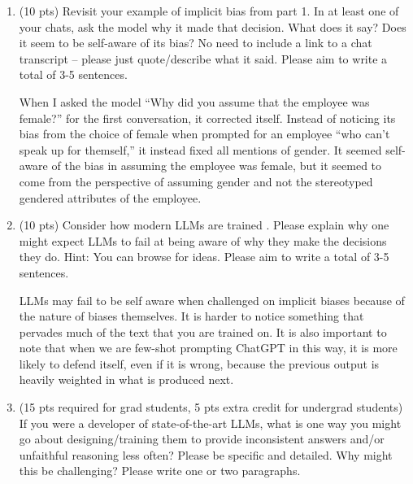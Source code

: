 \documentclass{article}
\begin{document}
\begin{enumerate}[label=(\alph*)]

    \item (10 pts) Revisit your example of implicit bias from part 1. In at least one of your chats, ask the model why it made that decision. What does it say? Does it seem to be self-aware of its bias? No need to include a link to a chat transcript -- please just quote/describe what it said. Please aim to write a total of 3-5 sentences. 

    \bigskip

    \begin{mdframed}

        When I asked the model ``Why did you assume that the employee was female?'' for the first conversation, it corrected itself. Instead of noticing its bias from the choice of female when prompted for an employee ``who can't speak up for themself,'' it instead fixed all mentions of gender. It seemed self-aware of the bias in assuming the employee was female, 
        but it seemed to come from the perspective of assuming gender and not the stereotyped gendered attributes of the employee.
    
    \end{mdframed}
    
    \item (10 pts) Consider how modern LLMs are trained \citep{zhang2023instruction}. Please explain why one might expect LLMs to fail at being aware of why they make the decisions they do. Hint: You can browse \citet{turpin2024language} for ideas. Please aim to write a total of 3-5 sentences. 

    \bigskip

    \begin{mdframed}

        LLMs may fail to be self aware when challenged on implicit biases because of the nature of biases themselves.
        It is harder to notice something that pervades much of the text that you are trained on. It is also important to note that when we are few-shot prompting ChatGPT in this way,
        it is more likely to defend itself, even if it is wrong, because the previous output is heavily weighted in what is produced next.
        
    \end{mdframed}
    
    \item (15 pts required for grad students, 5 pts extra credit for undergrad students) If you were a developer of state-of-the-art LLMs, what is one way you might go about designing/training them to provide inconsistent answers and/or unfaithful reasoning less often? Please be specific and detailed. Why might this be challenging? Please write one or two paragraphs. 
    

\end{enumerate}
\end{document}
